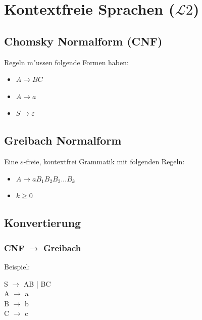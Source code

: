 \documentclass[11pt, a4paper]{scrartcl}
\begin{document}
\newpage


\section{Kontextfreie Sprachen ($\mathcal{L}2 $)}

\subsection{Chomsky Normalform (CNF)}

Regeln m"ussen folgende Formen haben:

\begin{itemize}
    \item $A \rightarrow BC$
    \item $A \rightarrow a$
    \item $S \rightarrow \varepsilon$
\end{itemize}

\subsection{Greibach Normalform}

Eine $\varepsilon$-freie, kontextfrei Grammatik mit folgenden Regeln:

\begin{itemize}
    \item $A \rightarrow aB_1B_2B_3...B_k$
    \item $k \geq 0$
\end{itemize}

\subsection{Konvertierung}

\subsubsection{CNF $\rightarrow$ Greibach}

Beispiel:

\vspace{0.5em}

S $\rightarrow$ AB | BC \\
A $\rightarrow$ a \\
B $\rightarrow$ b \\
C $\rightarrow$ c \\

\vspace{0.5em}
\end{document}
